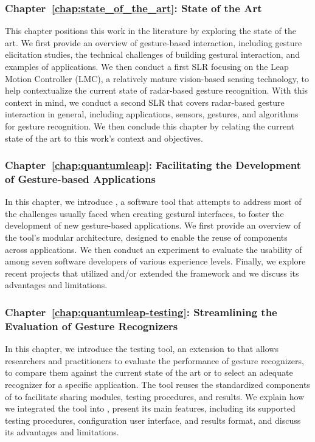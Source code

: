 \subsubsection{Chapter~\ref{chap:state_of_the_art}: State of the Art} 
This chapter positions this work in the literature by exploring the state of the art. 
%
We first provide an overview of gesture-based interaction, including gesture elicitation studies, the technical challenges of building gestural interaction, and examples of applications.
%
We then conduct a first SLR focusing on the Leap Motion Controller (LMC), a relatively mature vision-based sensing technology, to help contextualize the current state of radar-based gesture recognition.
%
With this context in mind, we conduct a second SLR that covers radar-based gesture interaction in general, including applications, sensors, gestures, and algorithms for gesture recognition.
%
We then conclude this chapter by relating the current state of the art to this work's context and objectives. 

\subsubsection{Chapter~\ref{chap:quantumleap}: Facilitating the Development of Gesture-based Applications} 
In this chapter, we introduce \ql, a software tool that attempts to address most of the challenges usually faced when creating gestural interfaces, to foster the development of new gesture-based applications.
%
We first provide an overview of the tool's modular architecture, designed to enable the reuse of components across applications.
%
We then conduct an experiment to evaluate the usability of \ql among seven software developers of various experience levels.
%
Finally, we explore recent projects that utilized and/or extended the \ql framework and we discuss its advantages and limitations.

\subsubsection{Chapter~\ref{chap:quantumleap-testing}: Streamlining the Evaluation of Gesture Recognizers} 
In this chapter, we introduce the \ql testing tool, an extension to \ql that allows researchers and practitioners to evaluate the performance of gesture recognizers, \eg to compare them against the current state of the art or to select an adequate recognizer for a specific application. The tool reuses the standardized components of \ql to facilitate sharing modules, testing procedures, and results.
%
We explain how we integrated the tool into \ql, present its main features, including its supported testing procedures, configuration user interface, and results format, and discuss its advantages and limitations.

